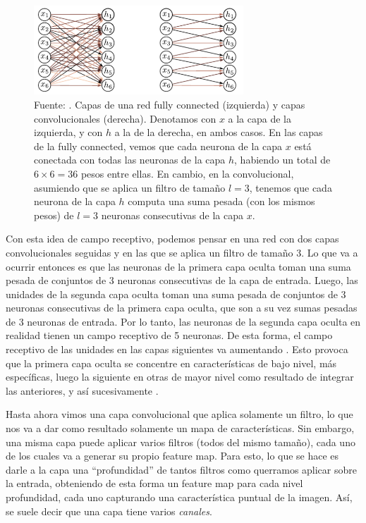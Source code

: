 \documentclass[../../main.tex]{subfiles}
\begin{document}
\begin{figure}
    \centering
    \includegraphics[width=0.7\textwidth]{figs/fully-connected-vs-conv.png}
    \caption{Fuente: \cite{prince2024understanding}. Capas de una red fully connected
    (izquierda) y capas convolucionales (derecha). Denotamos con \(x\) a la capa de la
    izquierda, y con \(h\) a la de la derecha, en ambos casos. En las capas de la fully
    connected, vemos que cada neurona de la capa \(x\) está conectada con todas las
    neuronas de la capa \(h\), habiendo un total de \(6 \times 6 = 36\) pesos entre ellas.
    En cambio, en la convolucional, asumiendo que se aplica un filtro de tamaño \(l=3\),
    tenemos que cada neurona de la capa \(h\) computa una suma pesada (con los mismos
    pesos) de \(l=3\) neuronas consecutivas de la capa \(x\).}
    \label{fig:fully-connected-vs-conv}
\end{figure}

Con esta idea de campo receptivo, podemos pensar en una red con dos capas convolucionales
seguidas y en las que se aplica un filtro de tamaño 3. Lo que va a ocurrir entonces es que
las neuronas de la primera capa oculta toman una suma pesada de conjuntos de 3 neuronas
consecutivas de la capa de entrada. Luego, las unidades de la segunda capa oculta toman
una suma pesada de conjuntos de 3 neuronas consecutivas de la primera capa oculta, que son
a su vez sumas pesadas de 3 neuronas de entrada. Por lo tanto, las neuronas de la segunda
capa oculta en realidad tienen un campo receptivo de 5 neuronas. De esta forma, el campo
receptivo de las unidades en las capas siguientes va aumentando \cite{prince2024understanding}.
Esto provoca que la primera capa oculta se concentre en características de bajo nivel,
más específicas, luego la siguiente en otras de mayor nivel como resultado de integrar
las anteriores, y así sucesivamente \cite{hands-on-ML-sklearn-tf}.

Hasta ahora vimos una capa convolucional que aplica solamente un filtro, lo que nos va a
dar como resultado solamente un mapa de características. Sin embargo, una misma capa puede
aplicar varios filtros (todos del mismo tamaño), cada uno de los cuales va a generar su
propio feature map. Para esto, lo que se hace es darle a la capa una ``profundidad'' de
tantos filtros como querramos aplicar sobre la entrada, obteniendo de esta forma un feature
map para cada nivel profundidad, cada uno capturando una característica puntual de la imagen.
Así, se suele decir que una capa tiene varios \textit{canales}.
\end{document}
